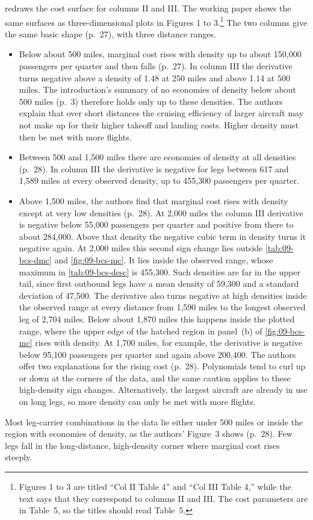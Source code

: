  redraws the cost surface for columns II and III. The working paper shows the same
surfaces as three-dimensional plots in Figures 1 to 3.\footnote{Figures 1 to 3 are titled ``Col II Table 4''
and ``Col III Table 4,'' while the text says that they correspond to columns II and III. The cost parameters
are in Table~5, so the titles should read Table~5.} The two columns give the same basic shape (p.~27), with
three distance ranges.
\begin{itemize}
  \item Below about 500 miles, marginal cost rises with density up to about 150,000 passengers per quarter
  and then falls (p.~27). In column III the derivative turns negative above a density of 1.48 at 250
  miles and above 1.14 at 500 miles. The introduction's summary of no economies of density below about 500 miles (p.~3)
  therefore holds only up to these densities. The authors explain that over short distances the cruising efficiency of larger aircraft may not make up for
  their higher takeoff and landing costs. Higher density must then be met with more flights.
  \item Between 500 and 1,500 miles there are economies of density at all densities (p.~28). In column III
  the derivative is negative for legs between 617 and 1,589 miles at every observed density, up to
  455,300 passengers per quarter.
  \item Above 1,500 miles, the authors find that marginal cost rises with density except at very low
  densities (p.~28). At 2,000 miles the column III derivative is negative below 55,000 passengers per
  quarter and positive from there to about 284,000. Above that density the negative cubic term in density
  turns it negative again. At 2,000 miles this second sign change lies outside \cref{tab:09-bcs-dmc} and
  \cref{fig:09-bcs-mc}. It lies inside the observed range, whose maximum in \cref{tab:09-bcs-desc} is
  455,300. Such densities are far in the upper tail, since first outbound legs have a mean density of 59,300
  and a standard deviation of 47,500. The derivative also turns negative at high densities inside the
  observed range at every distance from 1,590 miles to the longest observed leg of 2,704 miles. Below
  about 1,870 miles this happens inside the plotted range, where the upper edge of the hatched region in
  panel~(b) of \cref{fig:09-bcs-mc} rises with density. At 1,700 miles, for example, the derivative is
  negative below 95,100 passengers per quarter and again above 200,400. The authors offer two
  explanations for the rising cost (p.~28). Polynomials tend to curl up or down at the corners of the
  data, and the same caution applies to these high-density sign changes. Alternatively, the largest aircraft are
  already in use on long legs, so more density can only be met with more flights.
\end{itemize}
Most leg-carrier combinations in the data lie either under 500 miles or inside the region with economies of
density, as the authors' Figure~3 shows (p.~28). Few legs fall in the long-distance, high-density corner
where marginal cost rises steeply.

